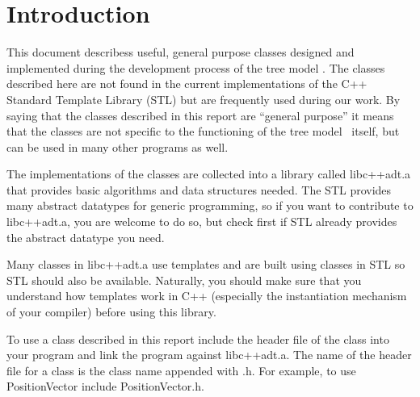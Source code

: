\section{Introduction}

This document describess useful,  general purpose classes designed and
implemented  during   the  development  process  of   the  tree  model
\lignum.  The classes  described here  are  not found  in the  current
implementations  of the C++  Standard Template  Library (STL)  but are
frequently used during our work.  By saying that the classes described
in this report  are ``general purpose'' it means  that the classes are
not specific to the functioning of the tree model \lignum\ itself, but
can be used in many other programs as well.

The implementations of the classes are collected into a library called
\linebreak  libc++adt.a  that   provides  basic  algorithms  and  data
structures  needed.  The  STL  provides many  abstract  datatypes  for
generic programming, so if you  want to contribute to libc++adt.a, you
are welcome  to do  so, but  check first if  STL already  provides the
abstract datatype you need.

Many classes in libc++adt.a use  templates and are built using classes
in STL  so STL  should also be  available. Naturally, you  should make
sure that  you understand  how templates work  in C++  (especially the
instantiation mechanism of your compiler) before using this library.

To use a class described in this report include the header file of the
class into your program and  link the program against libc++adt.a. The
name of  the header file for a  class is the class  name appended with
.h.  For example, to use PositionVector include PositionVector.h.
